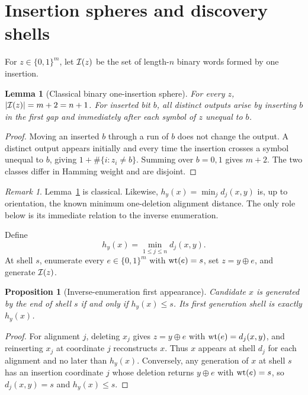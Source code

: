 \documentclass[11pt]{article}
\newtheorem{proposition}[theorem]{Proposition}
\newtheorem{lemma}[theorem]{Lemma}
\theoremstyle{remark}\newtheorem{remark}[theorem]{Remark}
\begin{document}
\section{Insertion spheres and discovery shells}
For $z\in\{0,1\}^{m}$, let $\mathcal I(z)$ be the set of length-$n$ binary words formed by one insertion.
\begin{lemma}[Classical binary one-insertion sphere]\label{lem:sphere}
For every $z$, $|\mathcal I(z)|=m+2=n+1$. For inserted bit $b$, all distinct outputs arise by inserting
$b$ in the first gap and immediately after each symbol of $z$ unequal to $b$.
\end{lemma}
\begin{proof}
Moving an inserted $b$ through a run of $b$ does not change the output. A distinct output appears
initially and every time the insertion crosses a symbol unequal to $b$, giving
$1+\#\{i:z_i\ne b\}$. Summing over $b=0,1$ gives $m+2$. The two classes differ in Hamming weight
and are disjoint.
\end{proof}
\begin{remark}
Lemma~\ref{lem:sphere} is classical. Likewise, $h_y(x)=\min_jd_j(x,y)$ is, up to orientation, the
known minimum one-deletion alignment distance. The only role below is its immediate relation to the
inverse enumeration.
\end{remark}

Define
\begin{equation}
 h_y(x)=\min_{1\le j\le n}d_j(x,y). \label{eq:hy}
\end{equation}
At shell $s$, enumerate every $e\in\{0,1\}^m$ with $\operatorname{wt}(e)=s$, set $z=y\oplus e$, and generate
$\mathcal I(z)$.
\begin{proposition}[Inverse-enumeration first appearance]\label{prop:shell}
Candidate $x$ is generated by the end of shell $s$ if and only if $h_y(x)\le s$. Its first
generation shell is exactly $h_y(x)$.
\end{proposition}
\begin{proof}
For alignment $j$, deleting $x_j$ gives $z=y\oplus e$ with $\operatorname{wt}(e)=d_j(x,y)$, and reinserting
$x_j$ at coordinate $j$ reconstructs $x$. Thus $x$ appears at shell $d_j$ for each alignment and
no later than $h_y(x)$. Conversely, any generation of $x$ at shell $s$ has an insertion coordinate
$j$ whose deletion returns $y\oplus e$ with $\operatorname{wt}(e)=s$, so $d_j(x,y)=s$ and $h_y(x)\le s$.
\end{proof}
\end{document}

